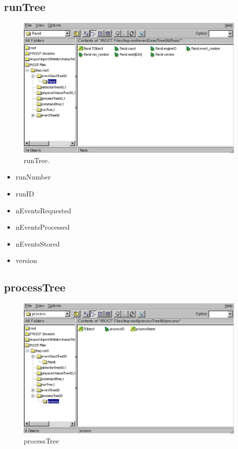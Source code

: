 \documentclass[a4paper,12pt]{article}
\begin{document}
  \subsection{runTree}
  \begin{figure}[H]
   \begin{center}
    \includegraphics[scale=0.5]{xwd/rn.eps}
   \end{center}
   \caption{runTree.}
  \end{figure}

  \begin{itemize}
   \item runNumber
   \item runID
   \item nEventsRequested
   \item nEventsProcessed
   \item nEventsStored
   \item version
  \end{itemize}

  \subsection{processTree}
  \begin{figure}[H]
   \begin{center}
    \includegraphics[scale=0.5]{xwd/pr.eps}
   \end{center}
   \caption{processTree}
  \end{figure}
  
\end{document}
